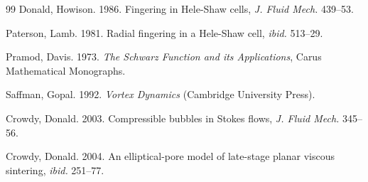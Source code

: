 \documentclass[fleqn]{jleo}
\begin{document}
\begin{thebibliography}{99}
Donald, Howison. 1986. Fingering in Hele-Shaw cells, {\it J. Fluid Mech.}  439--53.

Paterson, Lamb. 1981. Radial fingering in a Hele-Shaw
cell, {\it ibid.} 513--29.

Pramod, Davis. 1973. {\it The Schwarz Function and its
Applications}, Carus Mathematical Monographs.

Saffman, Gopal. 1992. {\it Vortex Dynamics} (Cambridge University Press).

Crowdy, Donald. 2003. Compressible bubbles in Stokes flows,
{\it J. Fluid Mech.} 345--56.

Crowdy, Donald. 2004. An elliptical-pore model of late-stage planar viscous sintering, {\it ibid.} 251--77.
\end{thebibliography}
\end{document}
